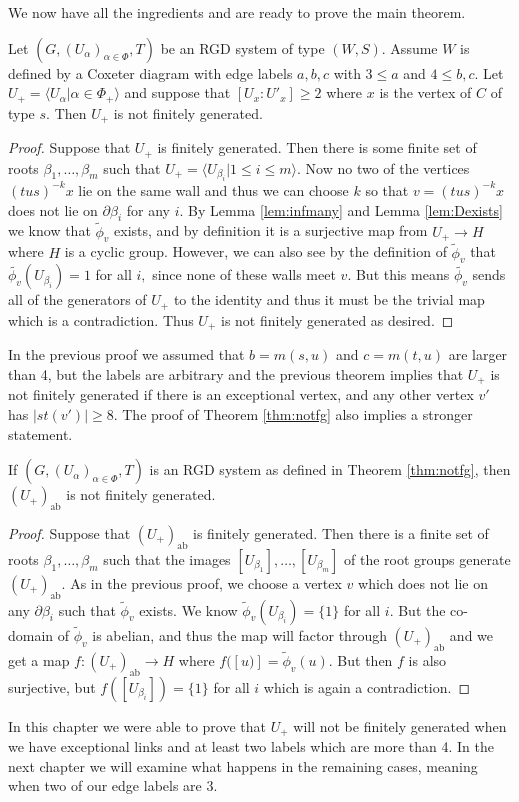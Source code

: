 \documentclass[class=book, crop=false,12 pt]{standalone}
\begin{document}
We now have all the ingredients and are ready to prove the main theorem.

\begin{theorem}
	\label{thm:notfg}
	Let $(G,(U_\alpha)_{\alpha\in \Phi},T)$ be an RGD system of type $(W,S).$ Assume $W$ is defined by a Coxeter diagram with edge labels $a,b,c$ with $3\le a$ and $4\le b,c.$ Let $U_+=\langle U_\alpha|\alpha\in \Phi_+\rangle$ and suppose that $[U_x:U'_x]\ge 2$ where $x$ is the vertex of $C$ of type $s.$ Then $U_+$ is not finitely generated.
\end{theorem}
\begin{proof}
	Suppose that $U_+$ is finitely generated. Then there is some finite set of roots $\beta_1,\dots,\beta_m$ such that $U_+=\langle U_{\beta_i}|1\le i\le m\rangle.$ Now no two of the vertices $(tus)^{-k}x$ lie on the same wall and thus we can choose $k$ so that $v=(tus)^{-k}x$ does not lie on $\partial \beta_i$ for any $i.$ By Lemma \ref{lem:infmany} and Lemma \ref{lem:Dexists} we know that $\tilde{\phi}_v$ exists, and by definition it is a surjective map from $U_+\to H$ where $H$ is a cyclic group. However, we can also see by the definition  of $\tilde{\phi}_v$ that $\tilde{\phi_v}(U_{\beta_i})=1$ for all $i,$ since none of these walls meet $v.$ But this means $\tilde{\phi_v}$ sends all of the generators of $U_+$ to the identity and thus it must be the trivial map which is a contradiction. Thus $U_+$ is not finitely generated as desired.
\end{proof}

In the previous proof we assumed that $b=m(s,u)$ and $c=m(t,u)$ are larger than 4, but the labels are arbitrary and the previous theorem implies that $U_+$ is not finitely generated if there is an exceptional vertex, and any other vertex $v'$ has $|st(v')|\ge 8.$ The proof of Theorem \ref{thm:notfg} also implies a stronger statement.

\begin{cor}
	\label{cor:abnotfg}
	If $(G,(U_\alpha)_{\alpha\in \Phi},T)$ is an RGD system as defined in Theorem \ref{thm:notfg}, then $(U_+)_\text{ab}$ is not finitely generated.
\end{cor}
\begin{proof}
	Suppose that $(U_+)_\text{ab}$ is finitely generated. Then there is a finite set of roots $\beta_1,\dots,\beta_m$ such that the images $[U_{\beta_1}],\dots,[U_{\beta_m}]$ of the root groups generate $(U_+)_\text{ab}.$ As in the previous proof, we choose a vertex $v$ which does not lie on any $\partial \beta_i$ such that $\tilde{\phi}_v$ exists. We know $\tilde{\phi}_v(U_{\beta_i})=\{1\}$ for all $i.$ But the co-domain of $\tilde{\phi}_v$ is abelian, and thus the map will factor through $(U_+)_\text{ab}$ and we get a map $f:(U_+)_\text{ab}\to H$ where $f([u)]=\tilde{\phi}_v(u).$ But then $f$ is also surjective, but $f([U_{\beta_i}])=\{1\}$ for all $i$ which is again a contradiction.
\end{proof}

In this chapter we were able to prove that $U_+$ will not be finitely generated when we have exceptional links and at least two labels which are more than 4. In the next chapter we will examine what happens in the remaining cases, meaning when two of our edge labels are 3.
\end{document}
